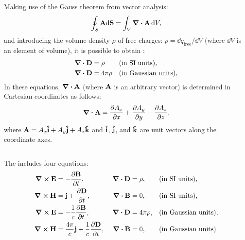 \subsection{}\label{27.4.2} Making use of the Gauss theorem from vector analysis:
\begin{equation*}%
\oint_{S} \vb{A} \dd \vb{S}  = \int_{V} \div \vb{A} \, \dd V, 
\end{equation*}
and introducing the volume density $\rho$ of free charges: $\rho = \dd q_{\textrm{free}}/\dd V$ (where $\dd V$ is an element of volume), it is possible to obtain :
\begin{align*}%
\div \vb{D} & = \rho && \text{(in SI units),} \\
\div \vb{D} & = 4 \pi \rho && \text{(in Gaussian units),}
\end{align*}
In these equations, $\div \vb{A}$ (where $\vb{A}$ is an arbitrary vector) is determined in Cartesian coordinates as follows:
\begin{equation*}%
\div \vb{A}= \pdv{A_{x}}{x} + \pdv{A_{y}}{y}  + \pdv{A_{z}}{z}, 
\end{equation*}
where $\vb{A} = A_{x} \vu{i}+ A_{y} \vu{j} + A_{z} \vu{k}$ and $\vu{i}$, $\vu{j}$, and $\vu{k}$ are unit vectors along the coordinate axes.

\subsection{}\label{27.4.3} The  includes four equations:
\begin{align*}%
\curl \vb{E} & = - \pdv{\vb{B}}{t},\,\, &\div \vb{D} & = \rho, && \text{(in SI units),} \\
\curl \vb{H} & = \vb{j} + \pdv{\vb{D}}{t},\,\, &\div \vb{B} & = 0, && \text{(in SI units),} \\
\curl \vb{E} & = - \frac{1}{c} \pdv{\vb{B}}{t},\,\, &\div \vb{D} &= 4 \pi \rho, && \text{(in Gaussian units),} \\
\curl \vb{H} & = \frac{4\pi}{c}\vb{j} + \frac{1}{c}\pdv{\vb{D}}{t},\,\, &\div \vb{B} &= 0,  && \text{(in Gaussian units).}
\end{align*}

